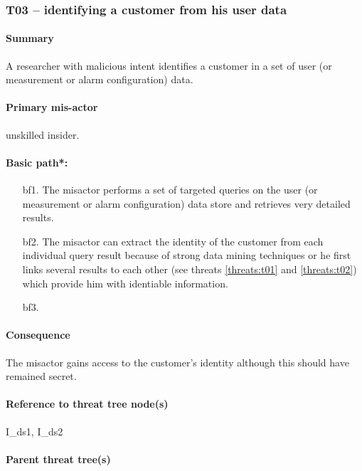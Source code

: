 \subsubsection{T03 -- identifying a customer from his user data}
\label{threats:t03}

\paragraph{Summary}

\npar A researcher with malicious intent identifies a customer in a set of user
(or measurement or alarm configuration) data.

\paragraph{Primary mis-actor}

\npar unskilled insider.

\paragraph{Basic path*:}
\begin{enumerate}
	\item[bf1.] The misactor performs a set of targeted queries on the user
	(or measurement or alarm configuration) data store and retrieves very detailed
	results.
    \item[bf2.] The misactor can extract the identity of the customer from each
    individual query result because of strong data mining techniques or he first
    links several results to each other (see threats \ref{threats:t01} and
    \ref{threats:t02}) which provide him with identiable information.
    \item[bf3.]
\end{enumerate}

\paragraph{Consequence}

\npar The misactor gains access to the customer's identity although this should
have remained secret.

\paragraph{Reference to threat tree node(s)}

I\_ds1, I\_ds2

\paragraph{Parent threat tree(s)}

